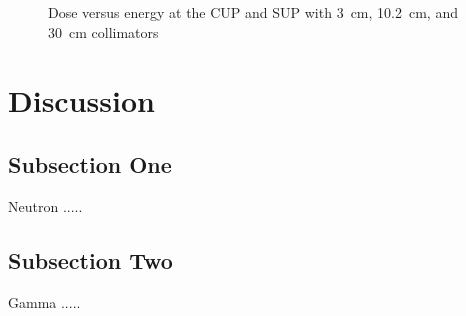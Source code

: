 \documentclass[12pt,journal]{IEEEtran}
\let\MYoriglatexcaption\caption
\renewcommand{\caption}[2][\relax]{\MYoriglatexcaption[#2]{#2}}
\begin{document}
\begin{figure}[!t] 
	\centering    
	\hfil
	\caption{Dose versus energy at the CUP and SUP with \SI{3}{\cm}, \SI{10.2}{\cm}, and \SI{30}{\cm} collimators}
	\label{fig:DoseVSenergy}
\end{figure}

\section{Discussion}

\subsection{Subsection One}

Neutron .....

\subsection{Subsection Two}

Gamma .....

\end{document}
